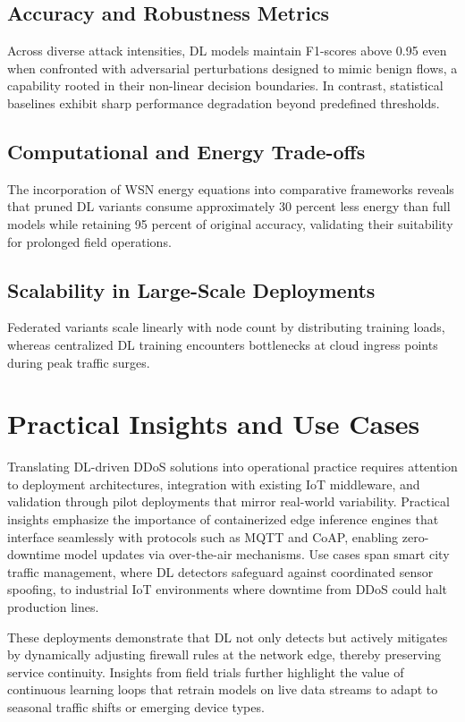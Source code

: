 \documentclass[12pt]{article}
\begin{document}
\subsection{Accuracy and Robustness Metrics}

Across diverse attack intensities, DL models maintain F1-scores above 0.95 even when confronted with adversarial perturbations designed to mimic benign flows, a capability rooted in their non-linear decision boundaries. In contrast, statistical baselines exhibit sharp performance degradation beyond predefined thresholds.

\subsection{Computational and Energy Trade-offs}

The incorporation of WSN energy equations into comparative frameworks reveals that pruned DL variants consume approximately 30 percent less energy than full models while retaining 95 percent of original accuracy, validating their suitability for prolonged field operations.

\subsection{Scalability in Large-Scale Deployments}

Federated variants scale linearly with node count by distributing training loads, whereas centralized DL training encounters bottlenecks at cloud ingress points during peak traffic surges.

\section{Practical Insights and Use Cases}

Translating DL-driven DDoS solutions into operational practice requires attention to deployment architectures, integration with existing IoT middleware, and validation through pilot deployments that mirror real-world variability. Practical insights emphasize the importance of containerized edge inference engines that interface seamlessly with protocols such as MQTT and CoAP, enabling zero-downtime model updates via over-the-air mechanisms. Use cases span smart city traffic management, where DL detectors safeguard against coordinated sensor spoofing, to industrial IoT environments where downtime from DDoS could halt production lines.

These deployments demonstrate that DL not only detects but actively mitigates by dynamically adjusting firewall rules at the network edge, thereby preserving service continuity. Insights from field trials further highlight the value of continuous learning loops that retrain models on live data streams to adapt to seasonal traffic shifts or emerging device types.
\end{document}
